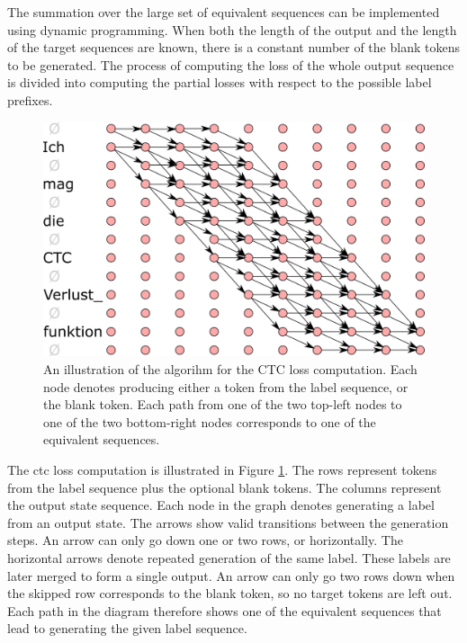 The summation over the large set of equivalent sequences can be
implemented using dynamic programming. When both the length of the output and
the length of the target sequences are known, there is a constant number of the
blank tokens to be generated. The process of computing the loss of the whole
output sequence is divided into computing the partial losses with respect to
the possible label prefixes.

\begin{figure}
  \centering

  \includegraphics[width=13cm]{img/ctc_schema.png}

  \caption{An illustration of the algorihm for the CTC loss computation. Each
    node denotes producing either a token from the label sequence, or the blank
    token. Each path from one of the two top-left nodes to one of the two
    bottom-right nodes corresponds to one of the equivalent sequences.  }
  \label{fig:ctc-dynamic-programming}
\end{figure}

The \ac{ctc} loss computation is illustrated in Figure
\ref{fig:ctc-dynamic-programming}. The rows represent tokens from the label
sequence plus the optional blank tokens. The columns represent the output state
sequence.  Each node in the graph denotes generating a label from an output
state. The arrows show valid transitions between the generation steps. An arrow
can only go down one or two rows, or horizontally.  The horizontal arrows
denote repeated generation of the same label. These labels are later merged to
form a single output. An arrow can only go two rows down when the skipped row
corresponds to the blank token, so no target tokens are left out. Each path in
the diagram therefore shows one of the equivalent sequences that lead to
generating the given label sequence.

